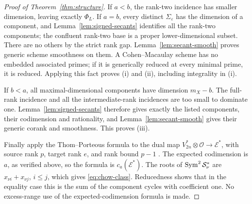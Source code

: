 \begin{proof}[Proof of Theorem~\ref{thm:structure}]
If $a<b$, the rank-two incidence has smaller dimension, leaving exactly $\Phi_L$. If $a=b$, every distinct $\Sigma_\varepsilon$ has the dimension of a component, and Lemma~\ref{lem:signed-secants} identifies all the rank-two components; the confluent rank-two base is a proper lower-dimensional subset. There are no others by the strict rank gap. Lemma~\ref{lem:secant-smooth} proves generic scheme smoothness on them. A Cohen--Macaulay scheme has no embedded associated primes; if it is generically reduced at every minimal prime, it is reduced. Applying this fact proves (i) and (ii), including integrality in (i).

If $b<a$, all maximal-dimensional components have dimension $m_X-b$. The full-rank incidence and all the intermediate-rank incidences are too small to dominate one. Lemma~\ref{lem:signed-secants} therefore gives exactly the listed components, their codimension and rationality, and Lemma~\ref{lem:secant-smooth} gives their generic corank and smoothness. This proves (iii).

Finally apply the Thom--Porteous formula to the dual map
$V_{2n}^*\otimes\mathcal O\longrightarrow\mathcal E^*$, with source rank $p$, target rank $e$, and rank bound $p-1$ \cite{KL,Fulton}. The expected codimension is $a$, as verified above, so the formula is $c_a(\mathcal E^*)$. The roots of $\operatorname{Sym}^2\mathcal S_\nu^*$ are $x_{\nu i}+x_{\nu j}$, $i\le j$, which gives \eqref{eq:chow-class}. Reducedness shows that in the equality case this is the sum of the component cycles with coefficient one. No excess-range use of the expected-codimension formula is made.
\end{proof}

